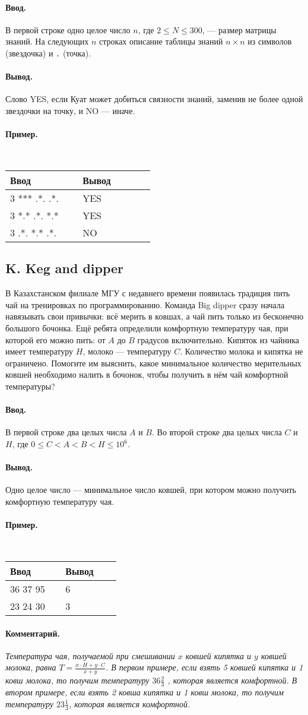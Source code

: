 \documentclass[12pt, a4paper]{article}
\newcommand{\informat}[1]
{
	\paragraph{Ввод.\\} #1
}
\newcommand{\outformat}[1]
{
	\paragraph{Вывод.\\} #1
}
\newcommand{\examplee}[4]
{
	\paragraph{Пример.\\}
	{\tt
	\begin{tabular}{|p{0.4\linewidth}|p{0.4\linewidth}|}
	\hline
	Ввод 	& Вывод  	\\
	\hline
	#1 		& #2 		\\
	\hline
	#3		& #4		\\
	\hline
	\end{tabular}
	}
}
\newcommand{\exampleee}[6]
{
	\paragraph{Пример.\\}
	{\tt
	\begin{tabular}{|p{0.4\linewidth}|p{0.4\linewidth}|}
	\hline
	Ввод 	& Вывод  	\\
	\hline
	#1 		& #2 		\\
	\hline
	#3		& #4		\\
	\hline
	#5		& #6		\\
	\hline
	\end{tabular}
	}
}
\newcommand{\excomm}[1]
{
	\paragraph{Комментарий. \\}
	\textit{#1}
}
\begin{document}
\informat{В первой строке одно целое число $n$, где $2 \le N \le 300$, --- размер матрицы знаний. \newline
На следующих $n$ строках описание таблицы знаний $n \times n$ из символов {\tt *} (звездочка) и {\tt .} (точка).}

\outformat{Слово YES, если Куат может добиться связности знаний, заменив не более одной звездочки на точку, и NO --- иначе.}

\exampleee
{3 \newline
*** \newline
.*. \newline
.*.
}{YES}
{3 \newline
*.* \newline
.*. \newline
*.*
}{YES}
{3 \newline
.*. \newline
*.* \newline
.*.
}{NO}



\subsection*{K. Keg and dipper}

В Казахстанском филиале МГУ с недавнего времени появилась традиция пить чай на тренировках по программированию. Команда Big dipper сразу начала навязывать свои привычки: всё мерить в ковшах, а чай пить только из бесконечно большого бочонка. Ещё ребята определили комфортную температуру чая, при которой его можно пить: от $A$ до $B$ градусов включительно. Кипяток из чайника имеет температуру $H$, молоко --- температуру $C$. Количество молока и кипятка не ограничено. Помогите им выяснить, какое минимальное количество мерительных ковшей необходимо налить в бочонок, чтобы получить в нём чай комфортной температуры?

\informat{В первой строке два целых числа $A$ и $B$. \newline
Во второй строке два целых числа $C$ и $H$, где $0 \le C < A < B < H \le 10^6$.}

\outformat{Одно целое число --- минимальное число ковшей, при котором можно получить комфортную температуру чая.}

\examplee
{36 37 \newline
25 95}{6}
{23 24 \newline
20 30
}{3}

\excomm{Температура чая, получаемой при смешивании $x$ ковшей кипятка и $y$ ковшей молока, равна $T = \frac{x \cdot H + y \cdot C}{x + y}$. \newline
В первом примере, если взять 5 ковшей кипятка и 1 ковш молока, то получим температуру $36 \frac23$ , которая является комфортной. \newline В втором примере, если взять 2 ковша кипятка и 1 ковш молока, то получим температуру $23 \frac13$, которая является комфортной.}
\end{document}
